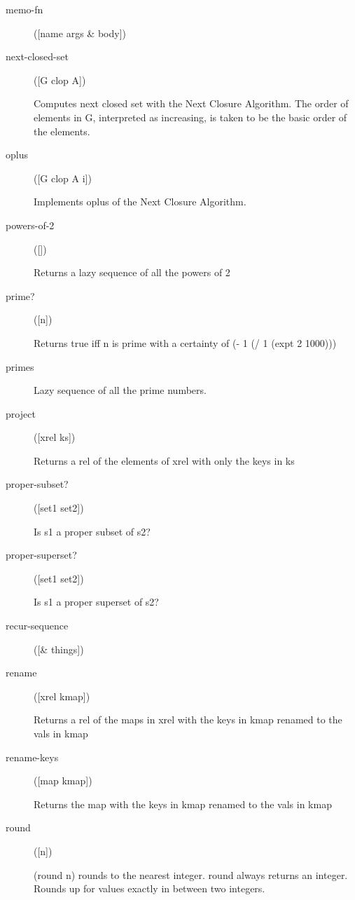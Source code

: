 \begin{description}
  \item[memo-fn]
([name args \& body])



  \item[next-closed-set]
([G clop A])

Computes next closed set with the Next Closure Algorithm. The order of elements in G,
  interpreted as increasing, is taken to be the basic order of the elements.

  \item[oplus]
([G clop A i])

Implements oplus of the Next Closure Algorithm.

  \item[powers-of-2]
([])

Returns a lazy sequence of all the powers of 2

  \item[prime?]
([n])

Returns true iff n is prime with a certainty of (- 1 (/ 1 (expt 2 1000)))

  \item[primes]


Lazy sequence of all the prime numbers.

  \item[project]
([xrel ks])

Returns a rel of the elements of xrel with only the keys in ks

  \item[proper-subset?]
([set1 set2])

Is s1 a proper subset of s2?

  \item[proper-superset?]
([set1 set2])

Is s1 a proper superset of s2?

  \item[recur-sequence]
([\& things])



  \item[rename]
([xrel kmap])

Returns a rel of the maps in xrel with the keys in kmap renamed to the vals in kmap

  \item[rename-keys]
([map kmap])

Returns the map with the keys in kmap renamed to the vals in kmap

  \item[round]
([n])

(round n) rounds to the nearest integer.
round always returns an integer.  Rounds up for values exactly in between two integers.


\end{description}
